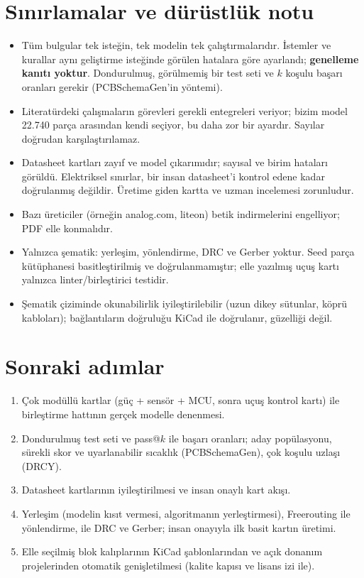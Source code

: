 \documentclass[11pt,a4paper]{article}
\newcommand{\code}[1]{\texttt{\detokenize{#1}}}
\begin{document}
\section{Sınırlamalar ve dürüstlük notu}
\begin{itemize}
\item Tüm bulgular tek isteğin, tek modelin tek çalıştırmalarıdır. İstemler ve kurallar aynı geliştirme isteğinde görülen hatalara göre ayarlandı; \textbf{genelleme kanıtı yoktur}. Dondurulmuş, görülmemiş bir test seti ve $k$ koşulu başarı oranları gerekir (PCBSchemaGen'in yöntemi).
\item Literatürdeki çalışmaların görevleri gerekli entegreleri veriyor; bizim model 22.740 parça arasından kendi seçiyor, bu daha zor bir ayardır. Sayılar doğrudan karşılaştırılamaz.
\item Datasheet kartları zayıf ve model çıkarımıdır; sayısal ve birim hataları görüldü. Elektriksel sınırlar, bir insan datasheet'i kontrol edene kadar doğrulanmış değildir. Üretime giden kartta \code{--strict} ve uzman incelemesi zorunludur.
\item Bazı üreticiler (örneğin analog.com, liteon) betik indirmelerini engelliyor; PDF elle konmalıdır.
\item Yalnızca şematik: yerleşim, yönlendirme, DRC ve Gerber yoktur. Seed parça kütüphanesi basitleştirilmiş ve doğrulanmamıştır; elle yazılmış uçuş kartı yalnızca linter/birleştirici testidir.
\item Şematik çiziminde okunabilirlik iyileştirilebilir (uzun dikey sütunlar, köprü kabloları); bağlantıların doğruluğu KiCad ile doğrulanır, güzelliği değil.
\end{itemize}

\section{Sonraki adımlar}
\begin{enumerate}
\item Çok modüllü kartlar (güç + sensör + MCU, sonra uçuş kontrol kartı) ile birleştirme hattının gerçek modelle denenmesi.
\item Dondurulmuş test seti ve pass@$k$ ile başarı oranları; aday popülasyonu, sürekli skor ve uyarlanabilir sıcaklık (PCBSchemaGen), çok koşulu uzlaşı (DRCY).
\item Datasheet kartlarının iyileştirilmesi ve insan onaylı kart akışı.
\item Yerleşim (modelin kısıt vermesi, algoritmanın yerleştirmesi), Freerouting ile yönlendirme, \code{kicad-cli} ile DRC ve Gerber; insan onayıyla ilk basit kartın üretimi.
\item Elle seçilmiş blok kalıplarının KiCad şablonlarından ve açık donanım projelerinden otomatik genişletilmesi (kalite kapısı ve lisans izi ile).
\end{enumerate}
\end{document}
